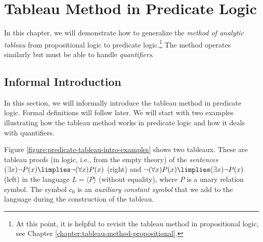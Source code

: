 \chapter{Tableau Method in Predicate Logic}

In this chapter, we will demonstrate how to generalize the \emph{method of analytic tableau} from propositional logic to predicate logic.\footnote{At this point, it is helpful to revisit the tableau method in propositional logic, see Chapter \ref{chapter:tableau-method-propositional}.} The method operates similarly but must be able to handle \emph{quantifiers}.

\section{Informal Introduction}

In this section, we will informally introduce the tableau method in predicate logic. Formal definitions will follow later. We will start with two examples illustrating how the tableau method works in predicate logic and how it deals with quantifiers.

\begin{example} Figure \ref{figure:predicate-tableau-intro-examples} shows two tableaux. These are tableau proofs (in logic, i.e., from the empty theory) of the \emph{sentences} $(\exists x)\neg P(x)\limplies\neg(\forall x)P(x)$ (right) and $\neg(\forall x)P(x)\limplies(\exists x)\neg P(x)$ (left) in the language $L=\langle P\rangle$ (without equality), where $P$ is a unary relation symbol. The symbol $c_0$ is an \emph{auxiliary constant symbol} that we add to the language during the construction of the tableau.
\end{example}


